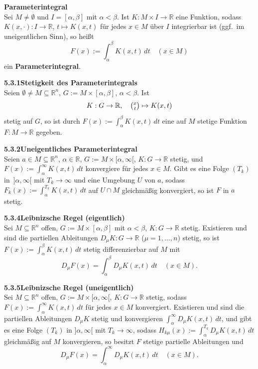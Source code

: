 \documentclass[a4paper,12pt]{article}
\newcommand{\gentry}[3]{%
  \noindent\textbf{#1\quad #2}\nopagebreak\\[0.2em]
  #3\par\smallskip
}
\begin{document}
\gentry{}{Parameterintegral}{%
  Sei $M \neq \emptyset$ und $I = [\alpha, \beta]$ mit $\alpha < \beta$. Ist
  $K: M \times I \to \mathbb{R}$ eine Funktion, sodass $K(x, \cdot): I \to \mathbb{R}$,
  $t \mapsto K(x,t)$ für jedes $x \in M$ über $I$ integrierbar ist (ggf.\ im
  uneigentlichen Sinn), so heißt
  \[
    F(x) := \int_\alpha^\beta K(x,t)\,dt \quad (x \in M)
  \]
  ein \textbf{Parameterintegral}.
}

\gentry{5.3.1}{Stetigkeit des Parameterintegrals}{%
  Seien $\emptyset \neq M \subseteq \mathbb{R}^n$, $G := M \times [\alpha, \beta]$,
  $\alpha < \beta$. Ist
  \[
    K: G \to \mathbb{R}, \quad \tbinom{x}{t} \mapsto K(x,t)
  \]
  stetig auf $G$, so ist durch $F(x) := \int_\alpha^\beta K(x,t)\,dt$ eine auf
  $M$ stetige Funktion $F: M \to \mathbb{R}$ gegeben.
}

\gentry{5.3.2}{Uneigentliches Parameterintegral}{%
  Seien $a \in M \subseteq \mathbb{R}^n$, $\alpha \in \mathbb{R}$, $G := M \times [\alpha, \infty[$,
  $K: G \to \mathbb{R}$ stetig, und $F(x) := \int_\alpha^\infty K(x,t)\,dt$
  konvergiere für jedes $x \in M$. Gibt es eine Folge $(T_k)$ in $\,]\alpha, \infty[$
  mit $T_k \to \infty$ und eine Umgebung $U$ von $a$, sodass
  $F_k(x) := \int_\alpha^{T_k} K(x,t)\,dt$ auf $U \cap M$ gleichmäßig konvergiert,
  so ist $F$ in $a$ stetig.
}

\gentry{5.3.4}{Leibnizsche Regel (eigentlich)}{%
  Sei $M \subseteq \mathbb{R}^n$ offen, $G := M \times [\alpha, \beta]$ mit $\alpha < \beta$,
  $K: G \to \mathbb{R}$ stetig. Existieren und sind die partiellen Ableitungen
  $D_\mu K: G \to \mathbb{R}$ ($\mu = 1, \ldots, n$) stetig, so ist
  $F(x) := \int_\alpha^\beta K(x,t)\,dt$ stetig differenzierbar auf $M$ mit
  \[
    D_\mu F(x) = \int_\alpha^\beta D_\mu K(x,t)\,dt \quad (x \in M).
  \]
}

\gentry{5.3.5}{Leibnizsche Regel (uneigentlich)}{%
  Sei $M \subseteq \mathbb{R}^n$ offen, $G := M \times [\alpha, \infty[$,
  $K: G \to \mathbb{R}$ stetig, sodass $F(x) := \int_\alpha^\infty K(x,t)\,dt$ für
  jedes $x \in M$ konvergiert. Existieren und sind die partiellen Ableitungen
  $D_\mu K$ stetig und konvergieren $\int_\alpha^\infty D_\mu K(x,t)\,dt$, und gibt
  es eine Folge $(T_k)$ in $]\alpha, \infty[$ mit $T_k \to \infty$, sodass
  $H_{k\mu}(x) := \int_\alpha^{T_k} D_\mu K(x,t)\,dt$ gleichmäßig auf $M$ konvergieren,
  so besitzt $F$ stetige partielle Ableitungen und
  \[
    D_\mu F(x) = \int_\alpha^\infty D_\mu K(x,t)\,dt \quad (x \in M).
  \]
}

\end{document}

